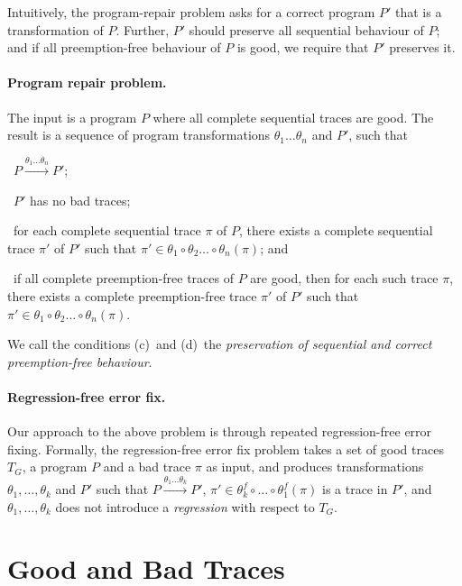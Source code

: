 \documentclass{llncs}
\newcommand\Prog{\ensuremath{\mathit{P}}}
\newcommand\trace{\pi}
\newcommand\reorder{\theta}
\begin{document}
Intuitively, the program-repair problem asks for a correct program
$\Prog'$ that is a transformation of $\Prog$.
Further, $\Prog'$ should preserve all sequential behaviour
of $\Prog$; and if all preemption-free behaviour of $\Prog$ is good, we
require that $\Prog'$ preserves it.

\paragraph{Program repair problem.}
The input is a program $\Prog$ where all complete sequential traces are
good.
The result is a sequence of program transformations $\reorder_1\ldots
\reorder_n$ and $\Prog'$, such that
\begin{inparaenum}[(a)]
\item~$\Prog\xrightarrow{\reorder_1\ldots \reorder_n}\Prog'$;
\item~$\Prog'$ has no bad traces;
\item~for each complete sequential trace $\trace$ of $\Prog$, there
  exists a complete sequential trace $\trace'$ of $\Prog'$ such that
  $\trace' \in \reorder_1 \circ \reorder_2 \ldots \circ \reorder_n
  (\trace)$; and
\item~if all complete preemption-free traces of $\Prog$ are good, then
  for each such trace $\trace$, there exists a complete preemption-free
  trace $\trace'$ of $\Prog'$ such that $\trace' \in \reorder_1 \circ
  \reorder_2 \ldots \circ \reorder_n (\trace)$.
\end{inparaenum}
We call the conditions (c)~and (d)~the {\em preservation of sequential and
correct preemption-free behaviour}.



\paragraph{Regression-free error fix.}
Our approach to the above problem is through repeated
regression-free error fixing.
Formally, the regression-free error fix problem takes a set of good
traces $T_G$, a program $\Prog$ and a bad trace $\trace$ as input,
and produces transformations $\reorder_1,\ldots,\reorder_k$ and $\Prog'$
such that $\Prog\xrightarrow{\reorder_1\ldots\reorder_k}\Prog'$,
$\trace'\in\reorder^f_k\circ\ldots\circ\reorder^f_1(\trace)$ is a trace
in $\Prog'$, and $\reorder_1,\ldots,\reorder_k$ does not introduce a {\em
regression} with respect to $T_G$.


\section{Good and Bad Traces}
\end{document}
